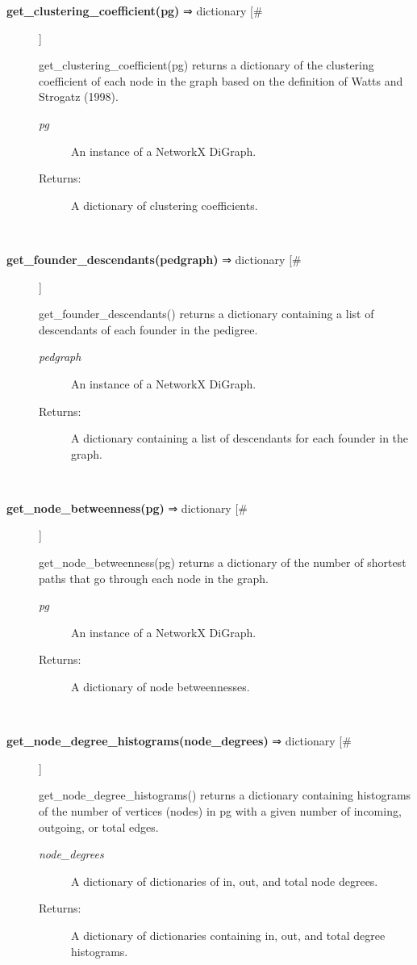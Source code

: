 \begin{description}
\item[\textbf{get\_clustering\_coefficient(pg)} ⇒ dictionary [\#]
]
\par get\_clustering\_coefficient(pg) returns a dictionary of the clustering
coefficient of each node in the graph based on the definition of Watts
and Strogatz (1998).
\begin{description}
\item[\textit{pg}
]
An instance of a NetworkX DiGraph.
\item[Returns:
]
A dictionary of clustering coefficients.
\end{description}\\

\item[\textbf{get\_founder\_descendants(pedgraph)} ⇒ dictionary [\#]
]
\par get\_founder\_descendants() returns a dictionary containing a list of descendants of
each founder in the pedigree.
\begin{description}
\item[\textit{pedgraph}
]
An instance of a NetworkX DiGraph.
\item[Returns:
]
A dictionary containing a list of descendants for each founder in the graph.
\end{description}\\

\item[\textbf{get\_node\_betweenness(pg)} ⇒ dictionary [\#]
]
\par get\_node\_betweenness(pg) returns a dictionary of the
number of shortest paths that go through each node in
the graph.
\begin{description}
\item[\textit{pg}
]
An instance of a NetworkX DiGraph.
\item[Returns:
]
A dictionary of node betweennesses.
\end{description}\\

\item[\textbf{get\_node\_degree\_histograms(node\_degrees)} ⇒ dictionary [\#]
]
\par get\_node\_degree\_histograms() returns a dictionary containing histograms of
the number of vertices (nodes) in pg with a given number of incoming,
outgoing, or total edges.
\begin{description}
\item[\textit{node\_degrees}
]
A dictionary of dictionaries of in, out, and total node degrees.
\item[Returns:
]
A dictionary of dictionaries containing in, out, and total degree histograms.
\end{description}\\


\end{description}

